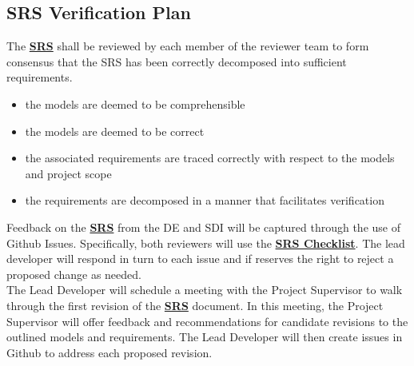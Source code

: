 \documentclass[12pt, titlepage]{article}
\begin{document}
\subsection{SRS Verification Plan}
The \textbf{\href{https://github.com/KiranSingh15/CAS-741-Image-Correspondences/blob/main/docs/SRS/SRS.pdf}
{SRS}} shall be reviewed by each member of the reviewer team to form consensus that the SRS has been correctly 
decomposed into sufficient requirements.
\begin{itemize}
\item the models are deemed to be comprehensible
\item the models are deemed to be correct
\item the associated requirements are traced correctly with respect to the models 
and project scope 
\item the requirements are decomposed in a manner that facilitates verification
\end{itemize}
Feedback on the \textbf{\href{https://github.com/KiranSingh15/CAS-741-Image-Correspondences/blob/main/docs/SRS/SRS.pdf}
{SRS}}
 from the DE and SDI will be captured through 
the use of Github Issues. Specifically, both reviewers will use the 
\textbf{\href{https://github.com/KiranSingh15/CAS-741-Image-Correspondences/blob/
main/docs/Checklists/SRS-Checklist.pdf}
{SRS Checklist}}. 
The lead developer will respond in turn to each issue and if 
reserves the right to reject a proposed change as needed. \\
The Lead Developer will schedule a meeting with the Project Supervisor to walk through 
the first revision of the \textbf{\href{https://github.com/KiranSingh15/CAS-741-Image-Correspondences/blob/main/docs/SRS/SRS.pdf}
{SRS}}
 document. In this meeting, the Project Supervisor will offer 
feedback and recommendations for candidate revisions to the outlined models and requirements. 
The Lead Developer will then create issues in Github to address each proposed revision.
\end{document}
